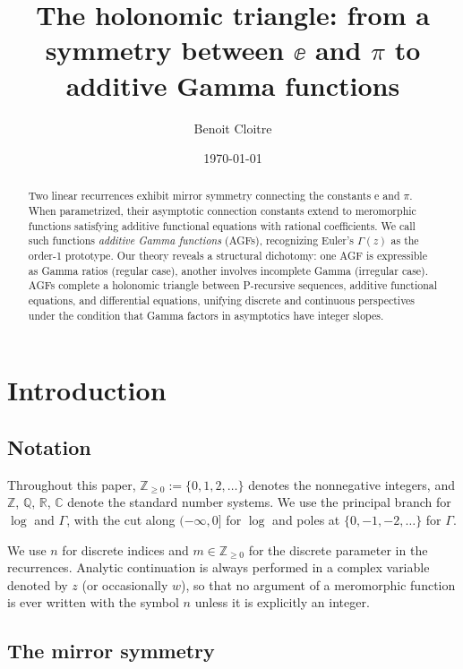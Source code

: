 \documentclass[11pt,reqno]{amsart}
\title[The holonomic triangle]{The holonomic triangle: from a symmetry between $\ee$ and $\pi$ to additive Gamma functions}
\author{Benoit Cloitre}
\date{\today}
\theoremstyle{definition}
\newcommand{\N}{\mathbb{Z}_{\ge 0}}
\newcommand{\Z}{\mathbb{Z}}
\newcommand{\Q}{\mathbb{Q}}
\newcommand{\C}{\mathbb{C}}
\newcommand{\R}{\mathbb{R}}
\newcommand{\ee}{\mathrm{e}}
\numberwithin{equation}{section}
\begin{document}
\maketitle

\begin{abstract}
Two linear recurrences exhibit mirror symmetry connecting the constants $\ee$ and $\pi$. When parametrized, their asymptotic connection constants extend to meromorphic functions satisfying additive functional equations with rational coefficients. We call such functions \emph{additive Gamma functions} (AGFs), recognizing Euler's $\Gamma(z)$ as the order-1 prototype. Our theory reveals a structural dichotomy: one AGF is expressible as Gamma ratios (regular case), another involves incomplete Gamma (irregular case).  AGFs complete a holonomic triangle between P-recursive sequences, additive functional equations, and differential equations, unifying discrete and continuous perspectives under the condition that Gamma factors in asymptotics have integer slopes.
\end{abstract}


\section{Introduction}

\subsection*{Notation}

Throughout this paper, $\N := \{0,1,2,\ldots\}$ denotes the nonnegative integers, and $\Z$, $\Q$, $\R$, $\C$ denote the standard number systems. We use the principal branch for $\log$ and $\Gamma$, with the cut along $(-\infty,0]$ for $\log$ and poles at $\{0,-1,-2,\ldots\}$ for $\Gamma$.

We use $n$ for discrete indices and $m\in\N$ for the discrete parameter in the recurrences. Analytic continuation is always performed in a complex variable denoted by $z$ (or occasionally $w$), so that no argument of a meromorphic function is ever written with the symbol $n$ unless it is explicitly an integer.


\subsection{The mirror symmetry}
\end{document}
